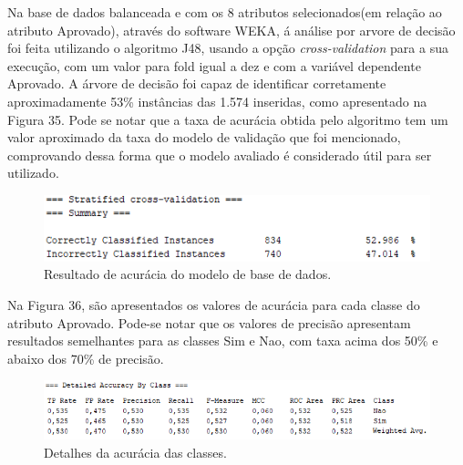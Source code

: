 \par
Na base de dados balanceada e com os 8 atributos selecionados(em relação ao atributo Aprovado), através do software WEKA, á análise por arvore de decisão foi feita utilizando o algoritmo J48, usando a opção \textit{cross-validation} para a sua execução, com um valor para fold igual a dez e com a variável dependente Aprovado. A árvore de decisão foi capaz de identificar corretamente aproximadamente 53\% instâncias das 1.574 inseridas, como apresentado na Figura 35. Pode se notar que a taxa de acurácia obtida pelo algoritmo tem um valor aproximado da taxa do modelo de validação que foi mencionado, comprovando dessa forma que o modelo avaliado é considerado útil para ser utilizado.

\par
\begin{figure}[!htp]
	\begin{center}
    \caption{\label{fig:waveform_fig} Resultado de acurácia do modelo de base de dados.}
	\includegraphics[scale=0.99]{Figuras/Resultado_acuracia.png}
	\end{center}
\end{figure}

\par
Na Figura 36, são apresentados os valores de acurácia para cada classe do atributo Aprovado. Pode-se notar que os valores de precisão apresentam resultados semelhantes para as classes Sim e Nao, com taxa acima dos 50\% e abaixo dos 70\% de precisão.

\par
\begin{figure}[!htp]
	\begin{center}
    \caption{\label{fig:waveform_fig} Detalhes da acurácia das classes.}
	\includegraphics[scale=0.93]{Figuras/Tabela_de_acuracia_das_classes.png}
	\end{center}
\end{figure}

